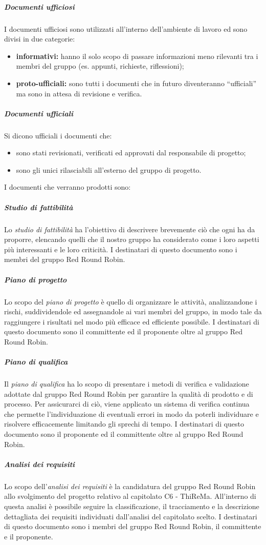 				\subparagraph{Documenti ufficiosi}
					I documenti ufficiosi sono utilizzati all'interno dell'ambiente di lavoro ed sono divisi in due categorie:
					\begin{itemize}
						\item \textbf{informativi:} hanno il solo scopo di passare informazioni meno rilevanti tra i membri del gruppo (es. appunti, richieste, riflessioni);
						\item \textbf{proto-ufficiali:} sono tutti i documenti che in futuro diventeranno ``ufficiali'' ma sono in attesa di revisione e verifica.
					\end{itemize}
				\subparagraph{Documenti ufficiali}
					Si dicono ufficiali i documenti che:
					\begin{itemize}
						\item sono stati revisionati, verificati ed approvati dal responsabile di progetto;
						\item sono gli unici rilasciabili all'esterno del gruppo di progetto.
					\end{itemize}
					I documenti che verranno prodotti sono:
				\subparagraph{Studio di fattibilità}
					Lo \textit{studio di fattibilità} ha l'obiettivo di descrivere brevemente ciò che ogni  ha da proporre, elencando quelli che il nostro gruppo ha considerato come i loro aspetti più interessanti e le loro criticità. I destinatari di questo documento sono i membri del gruppo Red Round Robin. 
				\subparagraph{Piano di progetto}
					Lo scopo del \textit{piano di progetto} è quello di organizzare le attività, analizzandone i rischi, suddividendole ed assegnandole ai vari membri del gruppo, in modo tale da raggiungere i risultati nel modo più efficace ed efficiente possibile. I destinatari di questo documento sono il committente ed il proponente oltre al gruppo Red Round Robin.
				\subparagraph{Piano di qualifica}
		 			Il \textit{piano di qualifica} ha lo scopo di presentare i metodi di verifica e validazione adottate dal gruppo Red Round Robin per garantire la qualità di prodotto e di processo. Per assicurarci di ciò, viene applicato un sistema di verifica continua che permette l'individuazione di eventuali errori in modo da poterli individuare e risolvere efficacemente limitando gli sprechi di tempo. I destinatari di questo documento sono il proponente ed il committente oltre al gruppo Red Round Robin.
		 		\subparagraph{Analisi dei requisiti}
		 			Lo scopo dell'\textit{analisi dei requisiti} è la candidatura del gruppo Red Round Robin allo svolgimento del progetto relativo al capitolato C6 - ThiReMa. All'interno di questa analisi è possibile seguire la classificazione, il tracciamento e la descrizione dettagliata dei requisiti individuati dall'analisi del capitolato scelto. I destinatari di questo documento sono i membri del gruppo Red Round Robin, il committente e il proponente.		
